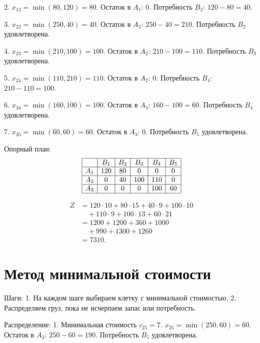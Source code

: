 \documentclass{article}
\begin{document}
2. \( x_{12} = \min(80, 120) = 80 \).  
   Остаток в \( A_1 \): 0.  
   Потребность \( B_2 \): \( 120 - 80 = 40 \).  

3. \( x_{22} = \min(250, 40) = 40 \).  
   Остаток в \( A_2 \): \( 250 - 40 = 210 \).  
   Потребность \( B_2 \) удовлетворена.  

4. \( x_{23} = \min(210, 100) = 100 \).  
   Остаток в \( A_2 \): \( 210 - 100 = 110 \).  
   Потребность \( B_3 \) удовлетворена.  

5. \( x_{24} = \min(110, 210) = 110 \).  
   Остаток в \( A_2 \): 0.  
   Потребность \( B_4 \): \( 210 - 110 = 100 \).  

6. \( x_{34} = \min(160, 100) = 100 \).  
   Остаток в \( A_3 \): \( 160 - 100 = 60 \).  
   Потребность \( B_4 \) удовлетворена.  

7. \( x_{35} = \min(60, 60) = 60 \).  
   Остаток в \( A_3 \): 0.  
   Потребность \( B_5 \) удовлетворена.  

Опорный план:  
\[
\begin{array}{|c|c|c|c|c|c|}
\hline
 & B_1 & B_2 & B_3 & B_4 & B_5 \\
\hline
A_1 & 120 & 80 & 0 & 0 & 0 \\
\hline
A_2 & 0 & 40 & 100 & 110 & 0 \\
\hline
A_3 & 0 & 0 & 0 & 100 & 60 \\
\hline
\end{array}
\]

\begin{align}
Z &= 120 \cdot 10 + 80 \cdot 15 + 40 \cdot 9 + 100 \cdot 10 \nonumber \\
   &\quad + 110 \cdot 9 + 100 \cdot 13 + 60 \cdot 21 \nonumber \\
   &= 1200 + 1200 + 360 + 1000 \nonumber \\
   &\quad + 990 + 1300 + 1260 \nonumber \\
   &= 7310.
\end{align}

\section{Метод минимальной стоимости}

Шаги:  
1. На каждом шаге выбираем клетку с минимальной стоимостью.  
2. Распределяем груз, пока не исчерпаем запас или потребность.  

Распределение:  
1. Минимальная стоимость \( c_{25} = 7 \).  
   \( x_{25} = \min(250, 60) = 60 \).  
   Остаток в \( A_2 \): \( 250 - 60 = 190 \).  
   Потребность \( B_5 \) удовлетворена.  
\end{document}
